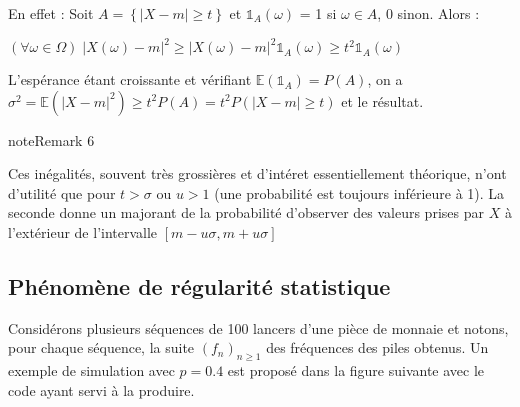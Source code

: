 \documentclass[letterpaper,10pt,english]{jupyterBook}
\begin{document}
\sphinxAtStartPar
En effet :
Soit \(A=\left \{|X-m|\geq t\right \}\) et \(\mathbb{1}_A(\omega)\) = 1 si \(\omega\in A\), 0 sinon. Alors :

\sphinxAtStartPar
\((\forall \omega\in\Omega)\; |X(\omega)-m|^2\geq |X(\omega)-m|^2\mathbb{1}_A(\omega) \geq t^2\mathbb{1}_A(\omega)\)

\sphinxAtStartPar
L’espérance étant croissante et vérifiant \(\mathbb{E}(\mathbb{1}_A)=P(A)\), on a
\(\sigma^2=\mathbb{E}(|X-m|^2)\geq t^2P(A) = t^2P(|X-m|\geq t)\) et le résultat.
\label{elemstats:remark-5}
\begin{sphinxadmonition}{note}{Remark 6}



\sphinxAtStartPar
Ces inégalités, souvent très grossières et d’intéret essentiellement théorique, n’ont d’utilité que pour \(t>\sigma\) ou \(u>1\) (une probabilité est toujours inférieure à 1). La seconde donne un majorant de la probabilité d’observer des valeurs prises par \(X\) à l’extérieur de l’intervalle \([m-u\sigma,m+u\sigma]\)
\end{sphinxadmonition}


\subsection{Phénomène de régularité statistique}
\label{\detokenize{elemstats:phenomene-de-regularite-statistique}}
\sphinxAtStartPar
Considérons plusieurs séquences de 100 lancers d’une pièce de monnaie et notons, pour chaque séquence, la suite \((f_n)_{n\geq 1}\) des fréquences des piles obtenus. Un exemple de simulation avec \(p=0.4\) est proposé dans la figure suivante avec le code ayant servi à la produire.
\end{document}
